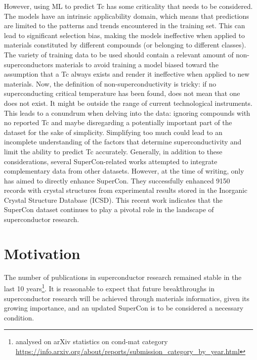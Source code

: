 However, using ML to predict Tc has some criticality that needs to be considered. 
The models have an intrinsic applicability domain, which means that predictions are limited to the patterns and trends encountered in the training set. 
This can lead to significant selection bias, making the models ineffective when applied to materials constituted by different compounds (or belonging to different classes). 
The variety of training data to be used should contain a relevant amount of non-superconductors materials to avoid training a model biased toward the assumption that a Tc always exists and render it ineffective when applied to new materials.
Now, the definition of non-superconductivity is tricky: if no superconducting critical temperature has been found, does not mean that one does not exist. It might be outside the range of current technological instruments. 
This leads to a conundrum when delving into the data: ignoring compounds with no reported Tc and maybe disregarding a potentially important part of the dataset for the sake of simplicity.
Simplifying too much could lead to an incomplete understanding of the factors that determine superconductivity and limit the ability to predict Tc accurately. 
Generally, in addition to these considerations, several SuperCon-related works attempted to integrate complementary data from other datasets. 
However, at the time of writing, only~\cite{sommer20223dsc} has aimed to directly enhance SuperCon.  
They successfully enhanced 9150 records with crystal structures from experimental results stored in the Inorganic Crystal Structure Database (ICSD). 
This recent work indicates that the SuperCon dataset continues to play a pivotal role in the landscape of superconductor research.

\section{Motivation}

The number of publications in superconductor research remained stable in the last 10 years\footnote{analysed on arXiv statistics on cond-mat category \url{https://info.arxiv.org/about/reports/submission_category_by_year.html}}.
It is reasonable to expect that future breakthroughs in superconductor research will be achieved through materials informatics, given its growing importance, and an updated SuperCon is to be considered a necessary condition. 

